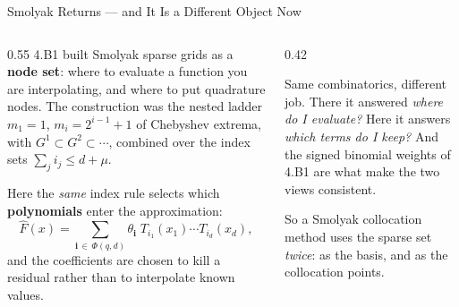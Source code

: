\begin{frame}{Smolyak Returns --- and It Is a Different Object Now}
\begin{columns}[T]
\begin{column}{0.55\textwidth}
\small
4.B1 built Smolyak sparse grids as a \textbf{node set}: where to evaluate a function you are interpolating, and where to put quadrature nodes. The construction was the nested ladder $m_1=1$, $m_i=2^{i-1}+1$ of Chebyshev extrema, with $G^1\subset G^2\subset\cdots$, combined over the index sets $\sum_j i_j\le d+\mu$.
\medskip

Here the \emph{same} index rule selects which \textbf{polynomials} enter the approximation:
\[
  \hat{F}(x)=\sum_{\mathbf{i}\,\in\,\Phi(q,d)}
  \theta_{\mathbf{i}}\;T_{i_1}(x_1)\cdots T_{i_d}(x_d),
\]
and the coefficients are chosen to kill a residual rather than to interpolate known values.
\end{column}
\begin{column}{0.42\textwidth}
\begin{conceptbox}[title=\textbf{Node set $\to$ basis}]\small
Same combinatorics, different job. There it answered \emph{where do I evaluate?} Here it answers \emph{which terms do I keep?}
\medskip
And the signed binomial weights of 4.B1 are what make the two views consistent.
\end{conceptbox}
\medskip
\begin{examplebox}\footnotesize
So a Smolyak collocation method uses the sparse set \emph{twice}: as the basis, and as the collocation points.
\end{examplebox}
\end{column}
\end{columns}
\vspace{1mm}
\end{frame}

